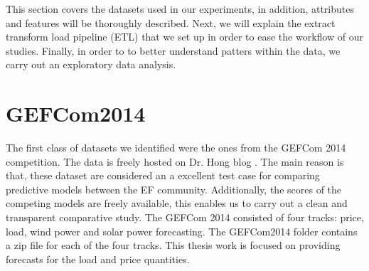 






This section covers the datasets used in our experiments, in addition, attributes and features will be thoroughly described.
Next, we will explain the extract transform load pipeline (ETL) that we set up in order to ease the workflow of our studies.
Finally, in order to to better understand patters within the data, we carry out an exploratory data analysis.

\section{GEFCom2014}
The first class of datasets we identified were the ones from the GEFCom 2014 competition. The data is freely hosted on Dr. Hong blog \cite{hong2016probabilistic}.
The main reason is that, these dataset are considered an a excellent test case for comparing predictive models between the EF community. Additionally, the scores of the competing models are freely available, this enables us to carry out a clean and transparent comparative study.
The GEFCom 2014 consisted of four tracks: price, load, wind power and solar power forecasting. 
The GEFCom2014 folder contains a zip file for each of the four tracks.
This thesis work is focused on providing forecasts for the load and price quantities.
\\
